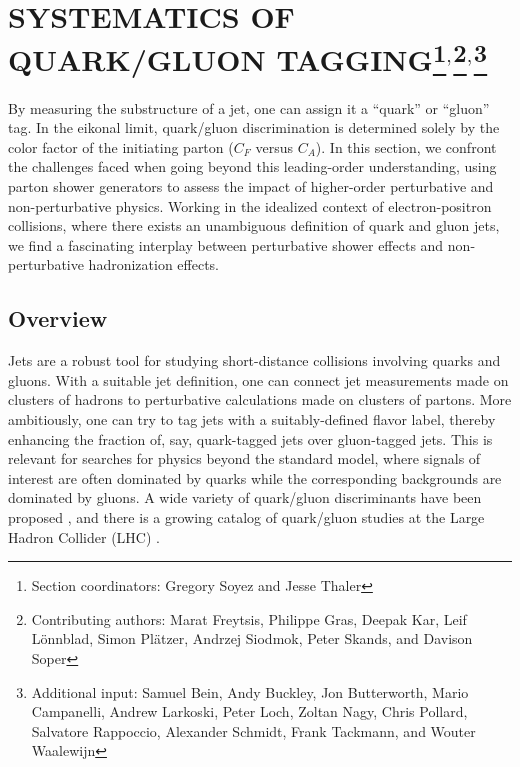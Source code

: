 \documentclass[11pt]{cernrep}
\begin{document}
\section{SYSTEMATICS OF QUARK/GLUON TAGGING\protect\footnote{Section coordinators: Gregory Soyez and Jesse Thaler}$^{,}$\protect\footnote{Contributing authors: Marat Freytsis, Philippe Gras, Deepak Kar, Leif L\"onnblad, Simon Pl\"atzer, Andrzej Siodmok, Peter Skands, and Davison Soper}$^{,}$\protect\footnote{Additional input: Samuel Bein, Andy Buckley, Jon Butterworth, Mario Campanelli, Andrew Larkoski, Peter Loch, Zoltan Nagy, Chris Pollard, Salvatore Rappoccio, Alexander Schmidt, Frank Tackmann, and Wouter Waalewijn}}

By measuring the substructure of a jet, one can assign it a ``quark'' or ``gluon'' tag.  In the eikonal limit, quark/gluon discrimination is determined solely by the color factor of the initiating parton ($C_F$ versus $C_A$).  In this section, we confront the challenges faced when going beyond this leading-order understanding, using parton shower generators to assess the impact of higher-order perturbative and non-perturbative physics.  Working in the idealized context of electron-positron collisions, where there exists an unambiguous definition of quark and gluon jets, we find a fascinating interplay between perturbative shower effects and non-perturbative hadronization effects.

\subsection{Overview}
\label{quarkgluon_sec:overview}

Jets are a robust tool for studying short-distance collisions involving quarks and gluons.  With a suitable jet definition, one can connect jet measurements made on clusters of hadrons to perturbative calculations made on clusters of partons.  More ambitiously, one can try to tag jets with a suitably-defined flavor label, thereby enhancing the fraction of, say, quark-tagged jets over gluon-tagged jets.  This is relevant for searches for physics beyond the standard model, where signals of interest are often dominated by quarks while the corresponding backgrounds are dominated by gluons.  A wide variety of quark/gluon discriminants have been proposed \cite{Gallicchio:2011xq,Gallicchio:2012ez,Krohn:2012fg,Pandolfi:1480598,Chatrchyan:2012sn,Larkoski:2013eya,Larkoski:2014pca}, and there is a growing catalog of quark/gluon studies at the Large Hadron Collider (LHC) \cite{Aad:2014gea,Aad:2014bia,Khachatryan:2014dea,Aad:2015owa,Khachatryan:2015bnx,Aad:2016oit}.
\end{document}
